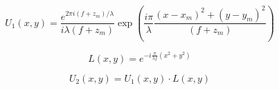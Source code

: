 \documentclass{kepfl}
\begin{document}
\begin{equation}
	{U_1}(x,y) = \frac{{{e^{2\pi i(f + {z_m})/\lambda }}}}{{i\lambda (f + {z_m})}}\exp \left( {\frac{{i\pi }}{\lambda }\frac{{{{(x - {x_m})}^2} + {{(y - {y_m})}^2}}}{{(f + {z_m})}}} \right)
\end{equation}

\begin{equation}
	L(x,y) = {e^{ - i\frac{\pi }{{\lambda f}}({x^2} + {y^2})}}
\end{equation}

\begin{equation}
{U_2}(x,y) = {U_1}(x,y) \cdot L(x,y)
\end{equation}
\end{document}
